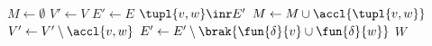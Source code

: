 \State $M\gets\emptyset$
\State $V'\gets V$
\State $E'\gets E$
\State $\tupl{v,w}\inr E'$
\State $M\gets M\cup\accl{\tupl{v,w}}$
\State $V'\gets V'\setminus\accl{v,w}$
\State $E'\gets E'\setminus\brak{\fun{\delta}{v}\cup\fun{\delta}{w}}$
\EndWhile
\State \Return $W$
\EndFunction